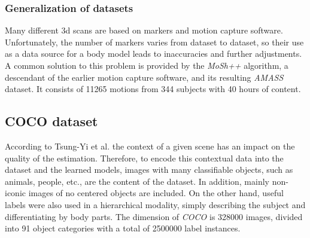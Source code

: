\subsubsection{Generalization of datasets}
Many different 3d scans are based on markers and motion capture software. Unfortunately, the number of markers varies from dataset to dataset, so their use as a data source for a body model leads to inaccuracies and further adjustments. A common solution to this problem is provided by the \emph{MoSh++} algorithm, a descendant of the earlier motion capture software, and its resulting \emph{AMASS} dataset. It consists of 11265 motions from 344 subjects with 40 hours of content.\cite{amass}

\subsection{COCO dataset} 
According to Tsung-Yi et al. the context of a given scene has an impact on the quality of the estimation. Therefore, to encode this contextual data into the dataset and the learned models, images with many classifiable objects, such as animals, people, etc., are the content of the dataset. In addition, mainly non-iconic images of no centered objects are included. On the other hand, useful labels were also used in a hierarchical modality, simply describing the subject and differentiating by body parts. The dimension of \emph{COCO} is 328000 images, divided into 91 object categories with a total of 2500000 label instances. \cite{coco}
\cite{mpii}
